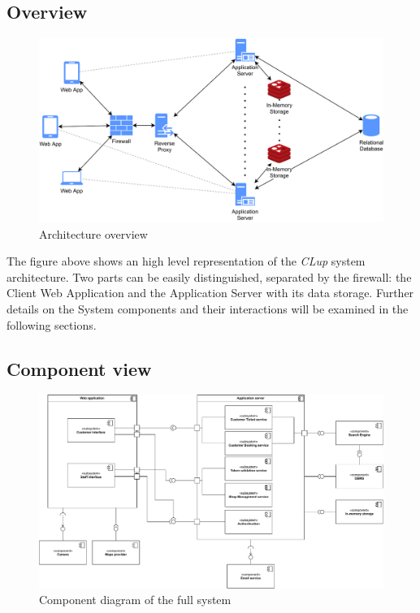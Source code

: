 \subsection{Overview}

\begin{figure}[H]
    \centering
    \includegraphics[width=.85\textwidth]{Images/overview.pdf}
    \caption{\label{fig:world_machine} Architecture overview}
\end{figure}
The figure above shows an high level representation of the \emph{CLup} system architecture.
Two parts can be easily distinguished, separated by the firewall: the Client Web Application and the Application Server with its data storage.
Further details on the System components and their interactions will be examined in the following sections.

\subsection{Component view}

\begin{figure}[H]
    \centering
    \includegraphics[width=.85\textwidth]{Images/component2.pdf}
    \caption{\label{fig:component_diagram} Component diagram of the full system}
\end{figure}

